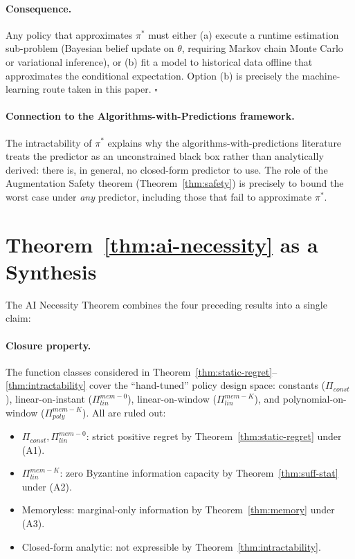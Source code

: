 \paragraph{Consequence.} Any policy that approximates $\pi^*$ must
either (a) execute a runtime estimation sub-problem (Bayesian belief
update on $\theta$, requiring Markov chain Monte Carlo or variational
inference), or (b) fit a model to historical data offline that
approximates the conditional expectation. Option (b) is precisely the
machine-learning route taken in this paper. $\square$

\paragraph{Connection to the Algorithms-with-Predictions
framework.} The intractability of $\pi^*$ explains why the
algorithms-with-predictions literature \cite{mitzenmacher2022algorithms}
treats the predictor as an unconstrained black box rather than
analytically derived: there is, in general, no closed-form predictor to
use. The role of the Augmentation Safety theorem
(Theorem~\ref{thm:safety}) is precisely to bound the worst case under
\emph{any} predictor, including those that fail to approximate $\pi^*$.

\section{Theorem~\ref{thm:ai-necessity} as a Synthesis}
\label{app:ai-necessity-full}

The AI Necessity Theorem combines the four preceding results into a
single claim:

\paragraph{Closure property.} The function classes considered in
Theorem~\ref{thm:static-regret}--\ref{thm:intractability} cover the
``hand-tuned'' policy design space: constants
($\Pi_{const}$), linear-on-instant ($\Pi_{lin}^{mem-0}$), linear-on-window
($\Pi_{lin}^{mem-K}$), and polynomial-on-window
($\Pi_{poly}^{mem-K}$). All are ruled out:

\begin{itemize}\setlength\itemsep{1pt}
\item $\Pi_{const}, \Pi_{lin}^{mem-0}$: strict positive regret by
Theorem~\ref{thm:static-regret} under (A1).
\item $\Pi_{lin}^{mem-K}$: zero Byzantine information capacity by
Theorem~\ref{thm:suff-stat} under (A2).
\item Memoryless: marginal-only information by Theorem~\ref{thm:memory}
under (A3).
\item Closed-form analytic: not expressible by
Theorem~\ref{thm:intractability}.
\end{itemize}


